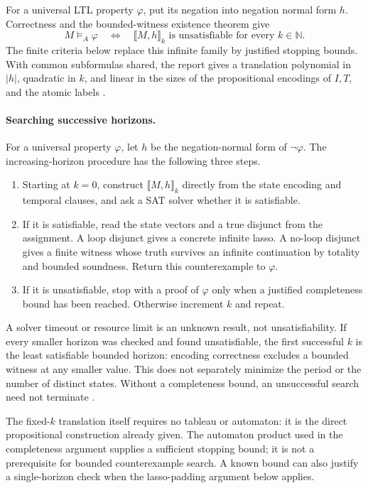 For a universal LTL property \(\varphi\), put its negation into negation
normal form \(h\). Correctness and the bounded-witness existence theorem give
\[
 M\models_A\varphi
 \quad\Longleftrightarrow\quad
 \llbracket M,h\rrbracket_k\text{ is unsatisfiable for every }k\in\mathbb N.
\]
The finite criteria below replace this infinite family by justified stopping
bounds. With common subformulas
shared, the report gives a translation polynomial in \(\lvert h\rvert\),
quadratic in \(k\), and linear in the sizes of the propositional encodings of
\(I,T\), and the atomic labels
\cite[defs.~10--15, thm.~16, and cor.~17]{BiereCimattiClarkeZhu1999}.

\paragraph{Searching successive horizons.}
\label{sec:p09-n-c-017-biere-horizon-search}
For a universal property \(\varphi\), let \(h\) be the
negation-normal form of \(\neg\varphi\). The increasing-horizon
procedure has the following three steps.
\begin{enumerate}
\item Starting at \(k=0\), construct \(\llbracket M,h\rrbracket_k\)
directly from the state encoding and temporal clauses, and ask a
SAT solver whether it is satisfiable.
\item If it is satisfiable, read the state vectors and a true
disjunct from the assignment. A loop disjunct gives a concrete
infinite lasso. A no-loop disjunct gives a finite witness whose
truth survives an infinite continuation by totality and bounded
soundness. Return this counterexample to \(\varphi\).
\item If it is unsatisfiable, stop with a proof of \(\varphi\)
only when a justified completeness bound has been reached.
Otherwise increment \(k\) and repeat.
\end{enumerate}
A solver timeout or resource limit is an unknown result, not
unsatisfiability. If every smaller horizon was checked and found
unsatisfiable, the first successful \(k\) is the least satisfiable
bounded horizon: encoding correctness excludes a bounded witness
at any smaller value. This does not separately minimize the
period or the number of distinct states. Without a completeness
bound, an unsuccessful search need not terminate
\cite[\S1 and opening of \S5]{BiereCimattiClarkeZhu1999}.

The fixed-\(k\) translation itself requires no tableau or
automaton: it is the direct propositional construction already
given. The automaton product used in the completeness argument
supplies a sufficient stopping bound; it is not a prerequisite
for bounded counterexample search. A known bound can also justify
a single-horizon check when the lasso-padding argument below
applies.

